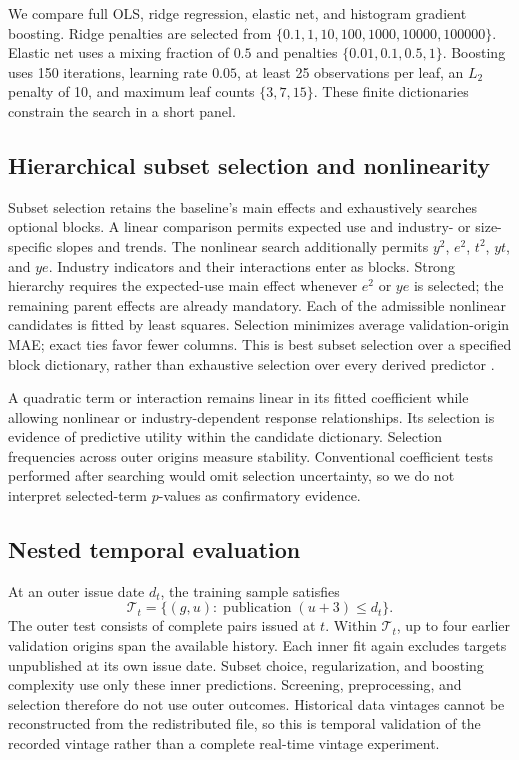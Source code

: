 \documentclass[11pt]{article}
\begin{document}
We compare full OLS, ridge regression, elastic net, and histogram gradient boosting. Ridge penalties are selected from $\{0.1,1,10,100,1000,10000,100000\}$. Elastic net uses a mixing fraction of $0.5$ and penalties $\{0.01,0.1,0.5,1\}$. Boosting uses 150 iterations, learning rate $0.05$, at least 25 observations per leaf, an $L_2$ penalty of 10, and maximum leaf counts $\{3,7,15\}$. These finite dictionaries constrain the search in a short panel.

\subsection{Hierarchical subset selection and nonlinearity}
Subset selection retains the baseline's main effects and exhaustively searches optional blocks. A linear comparison permits expected use and industry- or size-specific slopes and trends. The nonlinear search additionally permits $y^2$, $e^2$, $t^2$, $yt$, and $ye$. Industry indicators and their interactions enter as blocks. Strong hierarchy requires the expected-use main effect whenever $e^2$ or $ye$ is selected; the remaining parent effects are already mandatory. Each of the \SubsetCandidates{} admissible nonlinear candidates is fitted by least squares. Selection minimizes average validation-origin MAE; exact ties favor fewer columns. This is best subset selection over a specified block dictionary, rather than exhaustive selection over every derived predictor \cite{subset}.

A quadratic term or interaction remains linear in its fitted coefficient while allowing nonlinear or industry-dependent response relationships. Its selection is evidence of predictive utility within the candidate dictionary. Selection frequencies across outer origins measure stability. Conventional coefficient tests performed after searching would omit selection uncertainty, so we do not interpret selected-term $p$-values as confirmatory evidence.

\subsection{Nested temporal evaluation}
At an outer issue date $d_t$, the training sample satisfies
\begin{equation}
 \mathcal{T}_t=\{(g,u):\operatorname{publication}(u+3)\le d_t\}.
\end{equation}
The outer test consists of complete pairs issued at $t$. Within $\mathcal{T}_t$, up to four earlier validation origins span the available history. Each inner fit again excludes targets unpublished at its own issue date. Subset choice, regularization, and boosting complexity use only these inner predictions. Screening, preprocessing, and selection therefore do not use outer outcomes. Historical data vintages cannot be reconstructed from the redistributed file, so this is temporal validation of the recorded vintage rather than a complete real-time vintage experiment.
\end{document}
